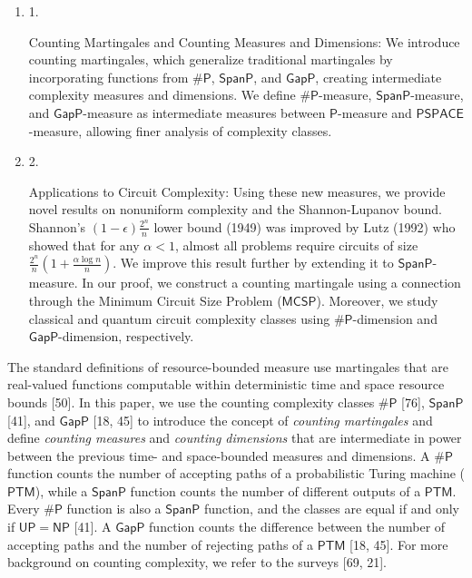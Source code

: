 \documentclass[10pt,a4paper]{article}
\begin{document}
\begin{enumerate}


\item[] 
1. 


Counting Martingales and Counting Measures and Dimensions: We introduce counting martingales, which generalize traditional martingales by incorporating functions from ${\mathsf{\#}\mathsf{P}}$, $\mathsf{SpanP}$, and $\mathsf{GapP}$, creating intermediate complexity measures and dimensions. We define ${\mathsf{\#}\mathsf{P}}$-measure, $\mathsf{SpanP}$-measure, and $\mathsf{GapP}$-measure as intermediate measures between $\mathsf{P}$-measure and $\mathsf{PSPACE}$-measure, allowing finer analysis of complexity classes.\par





\item[] 
2. 


Applications to Circuit Complexity: Using these new measures, we provide novel results on nonuniform complexity and the Shannon-Lupanov bound. Shannon’s $(1-\epsilon)\frac{2^{n}}{n}$ lower bound (1949) was improved by Lutz (1992) who showed that for any $\alpha<1$, almost all problems require circuits of size $\frac{2^{n}}{n}\!\left(1+\frac{\alpha\log n}{n}\right)$. We improve this result further by extending it to $\mathsf{SpanP}$-measure. In our proof, we construct a counting martingale using a connection through the Minimum Circuit Size Problem ($\mathsf{MCSP}$). Moreover, we study classical and quantum circuit complexity classes using ${\mathsf{\#}\mathsf{P}}$-dimension and $\mathsf{GapP}$-dimension, respectively.\par





\end{enumerate}




The standard definitions of resource-bounded measure use martingales that are real-valued functions computable within deterministic time and space resource bounds [50].
In this paper, we use the counting complexity classes ${\mathsf{\#}\mathsf{P}}$ [76], $\mathsf{SpanP}$ [41], and $\mathsf{GapP}$ [18, 45]
to introduce the concept of \emph{counting martingales} and define \emph{counting measures} and \emph{counting dimensions} that are intermediate in power between the previous time- and space-bounded measures and dimensions. A ${\mathsf{\#}\mathsf{P}}$ function counts the number of accepting paths of a probabilistic Turing machine ($\mathsf{PTM}$), while a $\mathsf{SpanP}$ function counts the number of different outputs of a $\mathsf{PTM}$. Every ${\mathsf{\#}\mathsf{P}}$ function is also a $\mathsf{SpanP}$ function, and the classes are equal if and only if $\mathsf{UP}=\mathsf{NP}$ [41].
A $\mathsf{GapP}$ function counts the difference between the number of accepting paths and the number of rejecting paths of a $\mathsf{PTM}$ [18, 45]. For more background on counting complexity, we refer to the surveys [69, 21].\par
\end{document}
